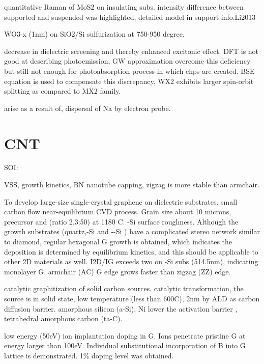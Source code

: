 quantitative Raman of MoS2 on insulating subs. intensity difference between supported and suspended was highlighted, detailed model in support info.Li2013

WO3-x (1nm) on SiO2/Si sulfurization at 750-950 degree,\cite{Elias2013}

decrease in dielectric screening and thereby enhanced excitonic effect.
DFT is not good at describing photoemission, GW approximation overcome this deficiency but still not enough for photoabsorption process in which ehps are created. BSE equation is used to compensate this discrepancy, WX2 exhibits larger spin-orbit splitting as compared to MX2 family.\cite{Ramasubramaniam2012}



arise as a result of, dispersal of Na by electron probe.



\section{CNT}

SOI:

VSS, growth kinetics,
BN nanotube capping, zigzag is more stable than armchair. \cite{Menon1999}


To develop large-size single-crystal graphene on dielectric substrates. small carbon flow near-equilibrium CVD process. Grain size about 10 microns, precursor  and  (ratio 2.3:50) at 1180 C. -Si surface roughness. Although the growth substrates (quartz,-Si and --Si ) have a complicated stereo network similar to diamond, regular hexagonal G growth is obtained, which indicates the deposition is determined by equilibrium kinetics, and this should be applicable to other 2D materials as well. I2D/IG exceeds two on -Si subs (514.5nm), indicating monolayer G. armchair (AC) G edge grows faster than zigzag (ZZ) edge.\cite{Chen2013j}

catalytic graphitization of solid carbon sources. catalytic transformation, the source is in solid state, low temperature (less than 600C), 2nm   by ALD as carbon diffusion barrier. amorphous silicon (a-Si), Ni lower the activation barrier ,  tetrahedral amorphous carbon (ta-C).\cite{Weatherup2013}

low energy (50eV) ion implantation doping in G. Ions penetrate pristine G at energy larger than 100eV. Individual substitutional incorporation of B into G lattice is demonstrated. 1\% doping level was obtained. \cite{Bangert2013}


